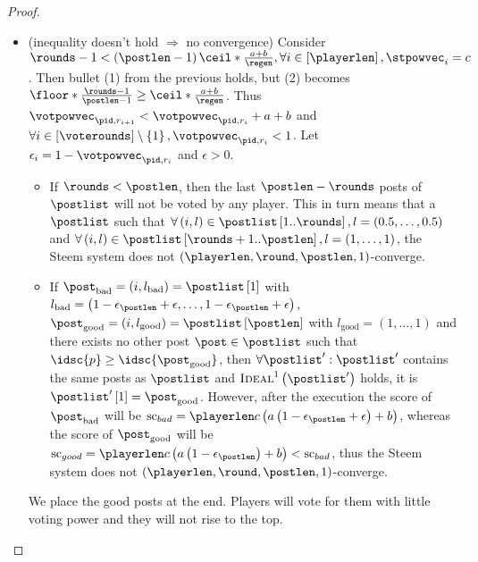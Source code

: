 \begin{proof}
\begin{itemize}
    \item (inequality doesn't hold $\Rightarrow$ no convergence) Consider
    $\rounds - 1 < \left(\postlen - 1\right)\ceil*{\frac{a+b}{\regen}}, \forall
    i \in \left[\playerlen\right], \stpowvec_i = c$. Then bullet (1) from the
    previous holds, but (2) becomes $\floor*{\frac{\rounds - 1}{\postlen - 1}}
    \geq \ceil*{\frac{a+b}{\regen}}$. Thus $\votpowvec_{\pid, r_{i + 1}} <
    \votpowvec_{\pid, r_i} + a + b$ and $\forall i \in \left[\voterounds\right]
    \setminus \left\{1\right\}, \votpowvec_{\pid, r_i} < 1$. Let $\epsilon_i = 1
    - \votpowvec_{\pid, r_i}$ and $\epsilon > 0$.
    \begin{itemize}
      \item If $\rounds < \postlen$, then the last $\postlen - \rounds$ posts of
      $\postlist$ will not be voted by any player. This in turn means that a
      $\postlist$ such that $\forall \left(i, l\right) \in
      \postlist\left[1..\rounds\right], l = \left(0.5, \dots, 0.5\right)$ and
      $\forall \left(i, l\right) \in \postlist\left[\rounds +
      1..\postlen\right], l = \left(1, \dots, 1\right)$, the Steem system does
      not $\left(\playerlen, \round, \postlen, 1\right)$-converge.

      \item If $\post_\mathrm{bad} = \left(i, l_\mathrm{bad}\right) =
      \postlist\left[1\right]$ with $l_\mathrm{bad} = \left(1 -
      \epsilon_\postlen + \epsilon, \dots, 1 - \epsilon_\postlen +
      \epsilon\right)$, $\post_\mathrm{good} = \left(i, l_\mathrm{good}\right) =
      \postlist\left[\postlen\right]$ with $l_\mathrm{good} = \left(1, \dots,
      1\right)$ and there exists no other post $\post \in \postlist$ such that
      $\idsc{p} \geq \idsc{\post_\mathrm{good}}$, then $\forall \postlist':
      \postlist'$ contains the same posts as $\postlist$ and
      $\textsc{Ideal}^1\left(\postlist'\right)$ holds, it is
      $\postlist'\left[1\right] = \post_\mathrm{good}$. However, after the
      execution the score of $\post_\mathrm{bad}$ will be $\mathrm{sc}_{bad} =
      \playerlen c \left(a \left(1 - \epsilon_\postlen + \epsilon\right) +
      b\right)$, whereas the score of $\post_\mathrm{good}$ will be
      $\mathrm{sc}_{good} = \playerlen c \left(a \left(1 -
      \epsilon_\postlen\right) + b\right) < \mathrm{sc}_{bad}$, thus the Steem
      system does not $\left(\playerlen, \round, \postlen, 1\right)$-converge.
    \end{itemize}
    We place the
    good posts at the end. Players will vote for them with little voting power
    and they will not rise to the top.
  \end{itemize}
\end{proof}
